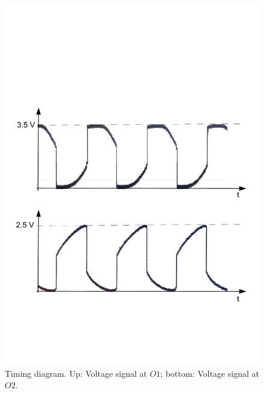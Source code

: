 \documentclass[journal]{IEEEtran}
\begin{document}
\begin{figure}
  \centering
   \includegraphics[trim=10mm 50mm 1mm 90mm, clip,
   width=\columnwidth]{img/am_timing.pdf}
   \caption{Timing diagram. Up: Voltage signal at $O1$; bottom: Voltage signal
   at $O2$.}
   \label{fig:am_timing}
\end{figure}
\end{document}
